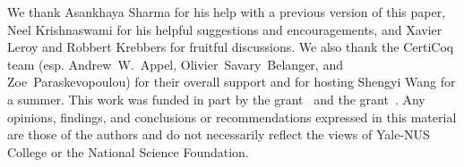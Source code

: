 \documentclass[acmsmall]{acmart}\settopmatter{}
\newcommand\hide[1]{}
\begin{document}
\begin{acks}
We thank Asankhaya Sharma for his help with a previous version of this paper,
Neel Krishnaswami for his helpful suggestions and encouragements, and 
Xavier Leroy and Robbert Krebbers for fruitful discussions. 
We also thank the CertiCoq team (esp. Andrew~W.~Appel, Olivier~Savary~Belanger, and 
Zoe~Paraskevopoulou) for their overall support and for hosting 
Shengyi Wang for a summer. This work was funded in part by the
 grant~\mbox{} and the  grant~.
Any opinions, findings, and conclusions or recommendations expressed in 
this material are those of the authors and do not necessarily reflect the 
views of Yale-NUS College or the National Science Foundation.
\hide{

  This material is based upon work supported by the
  \grantsponsor{GS100000001}{National Science
    Foundation}{http://dx.doi.org/10.13039/100000001} under Grant
  No.~\grantnum{GS100000001}{nnnnnnn} and Grant
  No.~\grantnum{GS100000001}{mmmmmmm}.  Any opinions, findings, and
  conclusions or recommendations expressed in this material are those
  of the author and do not necessarily reflect the views of the
  National Science Foundation.}
\end{acks}





\end{document}
